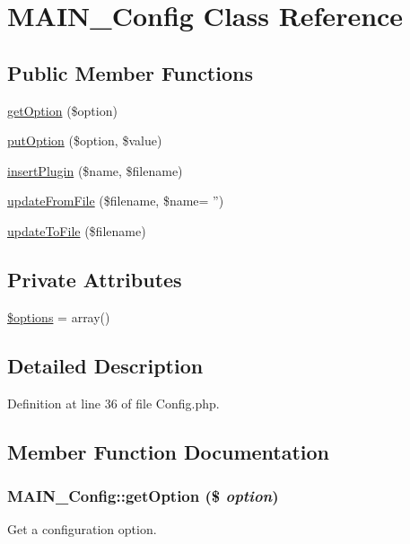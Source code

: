 \hypertarget{classMAIN__Config}{
\section{MAIN\_\-Config Class Reference}
\label{dc/d96/classMAIN__Config}
}
\subsection*{Public Member Functions}
\begin{DoxyCompactItemize}
\item 
\hyperlink{classMAIN__Config_ada84d4395bba0bac555477b54f34088d}{getOption} (\$option)
\item 
\hyperlink{classMAIN__Config_a8de584a5144c39504341867b7aabcd78}{putOption} (\$option, \$value)
\item 
\hyperlink{classMAIN__Config_abc9328fbcaa9bdad08924c639722dac1}{insertPlugin} (\$name, \$filename)
\item 
\hyperlink{classMAIN__Config_a636818348ea40ca509c190c004c89119}{updateFromFile} (\$filename, \$name= '')
\item 
\hyperlink{classMAIN__Config_a9316b105c92355638b38a37d61eb0021}{updateToFile} (\$filename)
\end{DoxyCompactItemize}
\subsection*{Private Attributes}
\begin{DoxyCompactItemize}
\item 
\hyperlink{classMAIN__Config_a25b93ec03bb1cffdfaf33b9f9b60e853}{\$options} = array()
\end{DoxyCompactItemize}


\subsection{Detailed Description}


Definition at line 36 of file Config.php.

\subsection{Member Function Documentation}
\hypertarget{classMAIN__Config_ada84d4395bba0bac555477b54f34088d}{
\subsubsection[{getOption}]{\setlength{\rightskip}{0pt plus 5cm}MAIN\_\-Config::getOption (\$ {\em option})}}
\label{dc/d96/classMAIN__Config_ada84d4395bba0bac555477b54f34088d}
Get a configuration option.


